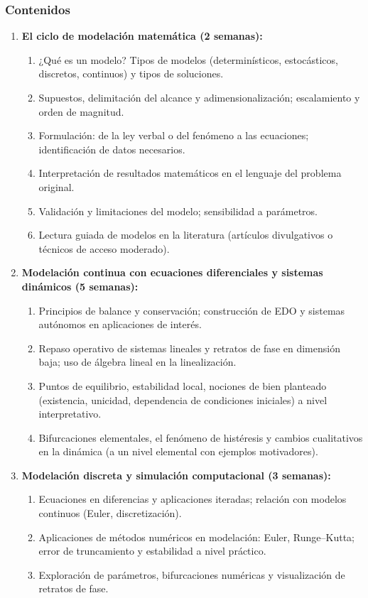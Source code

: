 \begin{refsection}
\subsubsection*{Contenidos}

\begin{enumerate}

\item \textbf{El ciclo de modelación matemática (2 semanas):}
\begin{enumerate}
    \item ¿Qué es un modelo? Tipos de modelos (determinísticos, estocásticos, discretos, continuos) y tipos de soluciones.
    \item Supuestos, delimitación del alcance y adimensionalización; escalamiento y orden de magnitud.
    \item Formulación: de la ley verbal o del fenómeno a las ecuaciones; identificación de datos necesarios.
    \item Interpretación de resultados matemáticos en el lenguaje del problema original.
    \item Validación y limitaciones del modelo; sensibilidad a parámetros.
    \item Lectura guiada de modelos en la literatura (artículos divulgativos o técnicos de acceso moderado).
\end{enumerate}

\item \textbf{Modelación continua con ecuaciones diferenciales y sistemas dinámicos (5 semanas):}
\begin{enumerate}
    \item Principios de balance y conservación; construcción de EDO y sistemas autónomos en aplicaciones de interés.
    \item Repaso operativo de sistemas lineales y retratos de fase en dimensión baja; uso de álgebra lineal en la linealización.
    \item Puntos de equilibrio, estabilidad local, nociones de bien planteado (existencia, unicidad, dependencia de condiciones iniciales) a nivel interpretativo.
    \item Bifurcaciones elementales, el fenómeno de histéresis y cambios cualitativos en la dinámica (a un nivel elemental con ejemplos motivadores).

\end{enumerate}

\item \textbf{Modelación discreta y simulación computacional (3 semanas):}
\begin{enumerate}
    \item Ecuaciones en diferencias y aplicaciones iteradas; relación con modelos continuos (Euler, discretización).
    \item Aplicaciones de métodos numéricos en modelación: Euler, Runge--Kutta; error de truncamiento y estabilidad a nivel práctico.
    \item Exploración de parámetros, bifurcaciones numéricas y visualización de retratos de fase.


\end{enumerate}
\end{enumerate}
\end{refsection}
